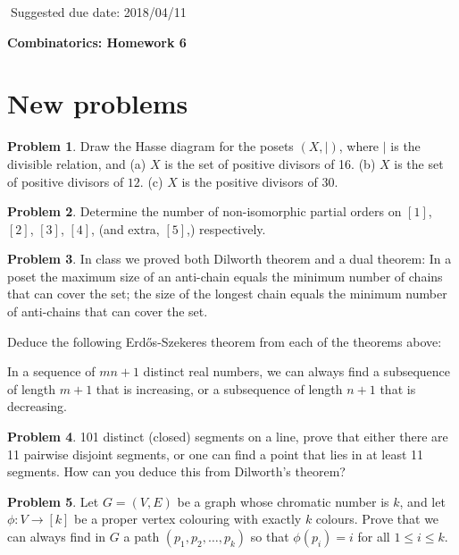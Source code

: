 \documentclass[12pt]{article}
\theoremstyle{definition}
\newtheorem{hw}{Problem}
\begin{document}
$\;$\hfill Suggested due date: 2018/04/11

\bigskip

\begin{center}
{\LARGE\bf Combinatorics: Homework 6}
\end{center}

\bigskip

\section{New problems}

\begin{hw} Draw the Hasse diagram for the posets $(X, |)$, where $|$ is the divisible relation, and
(a) $X$ is the set of positive divisors of 16. (b) $X$ is the set of positive divisors of $12$. (c) $X$ is the positive divisors of $30$.
\end{hw}

\begin{hw}
Determine the number of non-isomorphic partial orders on $[1]$, $[2]$, $[3]$, $[4]$, (and extra, $[5]$,) respectively.
\end{hw}

\begin{hw}
In class we proved both Dilworth theorem and a dual theorem: In a poset the maximum size of an anti-chain equals the minimum
number of chains that can cover the set; the size of the longest chain equals the minimum number of anti-chains that can cover the set.

Deduce the following Erd\H{o}s-Szekeres theorem from each of the theorems above:

In a sequence of $mn+1$ distinct real numbers, we can always find a subsequence of length $m+1$ that is increasing, or
 a subsequence of length $n+1$ that is decreasing.
\end{hw}

\begin{hw} 101 distinct (closed) segments on a line, prove that either there are 11 pairwise disjoint segments, or one can find a point that lies in at least 11 segments. How can you deduce this from Dilworth's theorem?
\end{hw}

\begin{hw}
Let $G=(V, E)$ be a graph whose chromatic number is $k$,
and let $\phi: V \to [k]$ be a proper vertex colouring with exactly
$k$ colours. Prove that we can always find in $G$ a path
$(p_1, p_2, \dots, p_k)$ so that $\phi(p_i) = i$ for all $1 \leq i \leq k$.
\end{hw}
\end{document}
